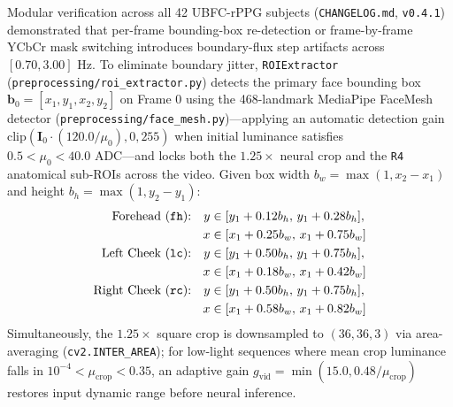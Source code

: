 \documentclass[conference]{IEEEtran}
\begin{document}
Modular verification across all 42 UBFC-rPPG subjects (\texttt{CHANGELOG.md}, \texttt{v0.4.1}) demonstrated that per-frame bounding-box re-detection or frame-by-frame YCbCr mask switching introduces boundary-flux step artifacts across $[0.70, 3.00]\text{ Hz}$. To eliminate boundary jitter, \texttt{ROIExtractor} (\texttt{preprocessing/roi\_extractor.py}) detects the primary face bounding box $\mathbf{b}_0 = [x_1, y_1, x_2, y_2]$ on Frame 0 using the 468-landmark MediaPipe FaceMesh detector (\texttt{preprocessing/face\_mesh.py})---applying an automatic detection gain $\text{clip}(\mathbf{I}_0 \cdot (120.0/\mu_0), 0, 255)$ when initial luminance satisfies $0.5 < \mu_0 < 40.0\text{ ADC}$---and locks both the $1.25\times$ neural crop and the \texttt{R4} anatomical sub-ROIs across the video. Given box width $b_w = \max(1, x_2-x_1)$ and height $b_h = \max(1, y_2-y_1)$:
\begin{align}
\text{Forehead (\texttt{fh}):} \quad y &\in [y_1 + 0.12 b_h, \, y_1 + 0.28 b_h], \nonumber\\
x &\in [x_1 + 0.25 b_w, \, x_1 + 0.75 b_w] \\
\text{Left Cheek (\texttt{lc}):} \quad y &\in [y_1 + 0.50 b_h, \, y_1 + 0.75 b_h], \nonumber\\
x &\in [x_1 + 0.18 b_w, \, x_1 + 0.42 b_w] \\
\text{Right Cheek (\texttt{rc}):} \quad y &\in [y_1 + 0.50 b_h, \, y_1 + 0.75 b_h], \nonumber\\
x &\in [x_1 + 0.58 b_w, \, x_1 + 0.82 b_w]
\end{align}
Simultaneously, the $1.25\times$ square crop is downsampled to $(36, 36, 3)$ via area-averaging (\texttt{cv2.INTER\_AREA}); for low-light sequences where mean crop luminance falls in $10^{-4} < \mu_{\text{crop}} < 0.35$, an adaptive gain $g_{\text{vid}} = \min(15.0, 0.48/\mu_{\text{crop}})$ restores input dynamic range before neural inference.
\end{document}
